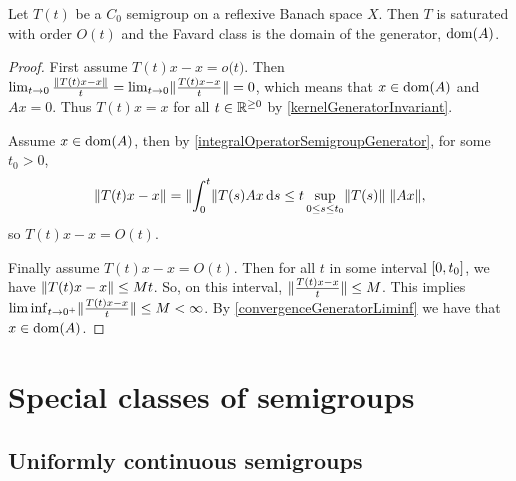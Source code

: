 \begin{proposition}
Let $T(t)$ be a $C_0$ semigroup on a reflexive Banach space $X$. Then $T$ is saturated with order $O(t)$ and the Favard class is the domain of the generator, $\operatorname{dom}(A)$.
\end{proposition}
\begin{proof}
First assume $T(t)x - x = o\big(t\big)$. Then $\lim_{t\to 0} \frac{\lVert T(t)x - x\rVert}{t} = \lim_{t\to 0}\lVert\frac{T(t)x-x}{t}\rVert = 0$, which means that $x\in \operatorname{dom}(A)$ and $Ax = 0$. Thus $T(t)x = x$ for all $t\in\mathbb{R}^{\geq 0}$ by \ref{kernelGeneratorInvariant}.

Assume $x\in\operatorname{dom}(A)$, then by \ref{integralOperatorSemigroupGenerator}, for some $t_0 > 0$,
\[ \lVert T(t)x-x\rVert = \lVert\int_0^t\rVert T(s)Ax\operatorname{d \!}{s}\leq t\sup_{0\leq s \leq t_0}\lVert T(s)\rVert\;\lVert Ax\rVert, \]
so $T(t)x-x = O(t)$.

Finally assume $T(t)x-x = O(t)$. Then for all $t$ in some interval $\interval{0,t_0}$, we have $\lVert T(t)x-x\rVert \leq Mt$. So, on this interval, $\lVert\frac{T(t)x-x}{t}\rVert \leq M$. This implies $\liminf_{t\to 0^+}\lVert\frac{T(t)x-x}{t}\rVert \leq M < \infty$. By \ref{convergenceGeneratorLiminf} we have that $x\in\operatorname{dom}(A)$.
\end{proof}



\chapter{Special classes of semigroups}

\section{Uniformly continuous semigroups}

